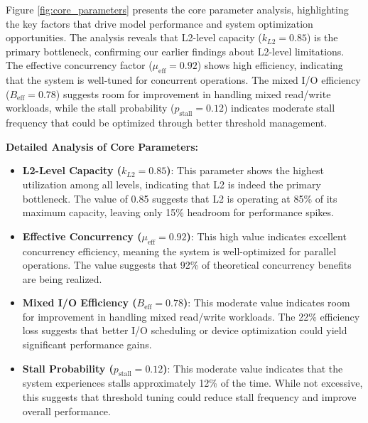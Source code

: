 \documentclass[11pt]{article}
\begin{document}
Figure \ref{fig:core_parameters} presents the core parameter analysis, highlighting the key factors that drive model performance and system optimization opportunities. The analysis reveals that L2-level capacity ($k_{L2} = 0.85$) is the primary bottleneck, confirming our earlier findings about L2-level limitations. The effective concurrency factor ($\mu_{\text{eff}} = 0.92$) shows high efficiency, indicating that the system is well-tuned for concurrent operations. The mixed I/O efficiency ($B_{\text{eff}} = 0.78$) suggests room for improvement in handling mixed read/write workloads, while the stall probability ($p_{\text{stall}} = 0.12$) indicates moderate stall frequency that could be optimized through better threshold management.

\textbf{Detailed Analysis of Core Parameters:}
\begin{itemize}
    \item \textbf{L2-Level Capacity ($k_{L2} = 0.85$)}: This parameter shows the highest utilization among all levels, indicating that L2 is indeed the primary bottleneck. The value of 0.85 suggests that L2 is operating at 85\% of its maximum capacity, leaving only 15\% headroom for performance spikes.
    \item \textbf{Effective Concurrency ($\mu_{\text{eff}} = 0.92$)}: This high value indicates excellent concurrency efficiency, meaning the system is well-optimized for parallel operations. The value suggests that 92\% of theoretical concurrency benefits are being realized.
    \item \textbf{Mixed I/O Efficiency ($B_{\text{eff}} = 0.78$)}: This moderate value indicates room for improvement in handling mixed read/write workloads. The 22\% efficiency loss suggests that better I/O scheduling or device optimization could yield significant performance gains.
    \item \textbf{Stall Probability ($p_{\text{stall}} = 0.12$)}: This moderate value indicates that the system experiences stalls approximately 12\% of the time. While not excessive, this suggests that threshold tuning could reduce stall frequency and improve overall performance.
\end{itemize}
\end{document}
